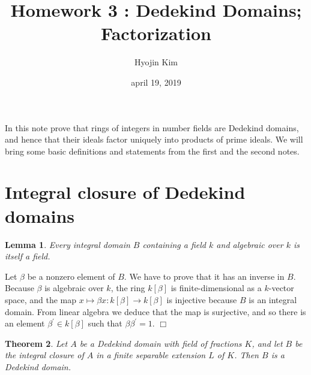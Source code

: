 \documentclass[11pt,a4paper,reqno]{amsart}
\numberwithin{equation}{section}
\newtheorem{thm}{Theorem}[section]
\newtheorem{lem}[thm]{Lemma}
\newenvironment{pf}{{\noindent \bf Proof:\ }}{\hfill $\Box$ \bigskip}
\begin{document}
 


\title{Homework 3 : Dedekind Domains; Factorization} 
\author{Hyojin Kim} 
\date{april 19, 2019} 
\maketitle 

In this note prove that rings of integers in number fields are Dedekind domains,
and hence that their ideals factor uniquely into products of prime ideals.
We will bring some basic definitions and statements from the first and the second notes.

\section{Integral closure of Dedekind domains} 

\begin{lem}\label{3.30} 
Every integral domain $B$ containing a field $k$ and algebraic over $k$ is itself a field.
\end{lem} 

\begin{pf}
Let $\beta$ be a nonzero element of $B$. We have to prove that it has an inverse in $B$.
Because $\beta$ is algebraic over $k$, the ring $k[\beta]$ is finite-dimensional as a $k$-vector space, 
and the map $x \mapsto \beta x :k[\beta] \rightarrow k[\beta]$ is injective because $B$ is an integral domain.
From linear algebra we deduce that the map is surjective, and so there is an element $\beta^\prime \in k[\beta]$ such that $\beta\beta^\prime =1$.
\end{pf}

\begin{thm}\label{3.29}
Let $A$ be a Dedekind domain with field of fractions $K$,
and let $B$ be the integral closure of $A$
in a finite separable extension $L$ of $K$.
Then $B$ is a Dedekind domain.
\end{thm}
\end{document}
